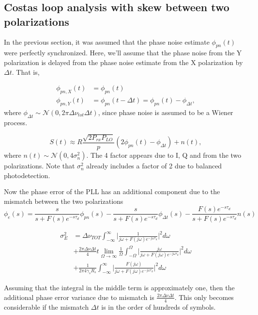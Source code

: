 \documentclass[a4paper]{article}
\begin{document}
\subsection{Costas loop analysis with skew between two polarizations}

In the previous section, it was assumed that the phase noise estimate $\phi_{pn}(t)$ were perfectly synchronized. Here, we'll assume that the phase noise from the Y polarization is delayed from the phase noise estimate from the X polarization by $\Delta t$. That is,

\begin{align}
\phi_{pn, X}(t) &= \phi_{pn}(t) \\
\phi_{pn, Y}(t)& = \phi_{pn}(t-\Delta t) = \phi_{pn}(t) - \phi_{\Delta t},
\end{align}
where $\phi_{\Delta t} \sim \mathcal{N}(0, 2\pi\Delta\nu_{tot}\Delta t)$, since phase noise is assumed to be a Wiener process.

\begin{equation}
S(t) \approx R\frac{\sqrt{2P_{rx}P_{LO}}}{p}(2\phi_{pn}(t) - \phi_{\Delta t}) + n(t),
\end{equation}
where $n(t) \sim\mathcal{N}(0, 4\sigma_n^2)$. The 4 factor appears due to I, Q and from the two polarizations. Note that $\sigma_n^2$ already includes a factor of 2 due to balanced photodetection. 

Now the phase error of the PLL has an additional component due to the mismatch between the two polarizations
\begin{equation}
\phi_e(s) = \frac{s}{s + F(s)e^{-s\tau_d}}\phi_{pn}(s) - \frac{s}{s + F(s)e^{-s\tau_d}}\phi_{\Delta t}(s) - \frac{F(s)e^{-s\tau_d}}{s + F(s)e^{-s\tau_d}}n(s)
\end{equation}

\begin{align} \nonumber
\sigma_E^2 &= \Delta\nu_{TOT}\int_{-\infty}^\infty \bigg|\frac{1}{j\omega +  F(j\omega)e^{-j\omega\tau_d}}\bigg|^2d\omega \\
& + \frac{2\pi\Delta\nu\Delta t}{4} t\lim_{\Omega\to\infty}\frac{1}{\Omega}\int_{-\Omega}^\Omega \bigg|\frac{j\omega}{j\omega +  F(j\omega)e^{-j\omega\tau_d}}\bigg|^2d\omega \\
&+ \frac{1}{2\pi 4\gamma_sR_s}\int_{-\infty}^\infty \bigg|\frac{F(j\omega)}{j\omega + F(j\omega)e^{-j\omega\tau_d}}\bigg|^2d\omega \nonumber
\end{align}

Assuming that the integral in the middle term is approximately one, then the additional phase error variance due to mismatch is $\frac{2\pi\Delta\nu\Delta t}{4}$. This only becomes considerable if the mismatch $\Delta t$ is in the order of hundreds of symbols.
\end{document}
